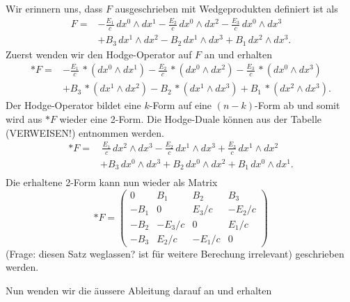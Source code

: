 Wir erinnern uns, dass $F$ ausgeschrieben mit Wedgeprodukten definiert ist als
\begin{align*}
	F = 
	& - \frac{E_{1}}{c} \, dx^0 \wedge dx^1 - \frac{E_{2}}{c} \, dx^0 \wedge dx^2 - \frac{E_{3}}{c} \, dx^0 \wedge dx^3 \\
	& + B_3 \, dx^1 \wedge dx^2 - B_2 \, dx^1 \wedge dx^3 + B_1 \, dx^2 \wedge dx^3.
\end{align*}
Zuerst wenden wir den Hodge-Operator auf $F$ an und erhalten
\begin{align*}
	\ast F =
	& - \frac{E_{1}}{c} \, \ast(dx^0 \wedge dx^1) - \frac{E_{2}}{c} \, \ast(dx^0 \wedge dx^2) - \frac{E_{3}}{c} \, \ast(dx^0 \wedge dx^3) \\
	& + B_3 \, \ast(dx^1 \wedge dx^2) - B_2 \, \ast(dx^1 \wedge dx^3) + B_1 \, \ast(dx^2 \wedge dx^3).
\end{align*}
Der Hodge-Operator bildet eine $k$-Form auf eine $(n-k)$-Form ab und somit wird aus $\ast F$ wieder eine 2-Form.
Die Hodge-Duale können aus der Tabelle (VERWEISEN!) entnommen werden.
\begin{align*}
	\ast F =
	& \, \frac{E_{1}}{c} \, dx^2 \wedge dx^3 - \frac{E_{2}}{c} \, dx^1 \wedge dx^3 + \frac{E_{3}}{c} \, dx^1 \wedge dx^2 \\
	& + B_3 \, dx^0 \wedge dx^3 + B_2 \, dx^0 \wedge dx^2 + B_1 \, dx^0 \wedge dx^1.\\
\end{align*}
Die erhaltene 2-Form kann nun wieder als Matrix
\begin{equation}
	\ast F = \begin{pmatrix}
		0 & B_1 & B_2 & B_3 \\ -B_1 & 0 & E_3/c & -E_2/c \\ -B_2 & -E_3/c & 0 & E_1/c \\ -B_3 & E_2/c & -E_1/c & 0 
	\end{pmatrix}
\end{equation}
(Frage: diesen Satz weglassen? ist für weitere Berechung irrelevant) geschrieben werden.

Nun wenden wir die äussere Ableitung darauf an und erhalten

